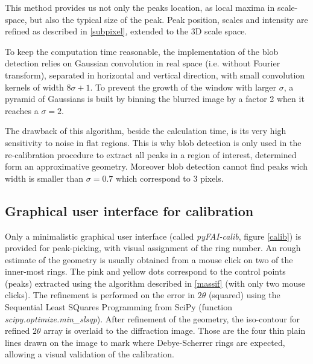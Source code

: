 \documentclass[preprint]{iucr}
\begin{document}
This method provides us not only the peaks location, as local maxima in
scale-space, but also the typical size of the peak.
Peak position, scales and intensity are refined as described in
\ref{subpixel}, extended to the 3D scale space.

To keep the computation time reasonable, the implementation of the blob
detection relies on Gaussian convolution in real space (i.e. without Fourier
transform), separated in horizontal and vertical direction, with small
convolution kernels of width $8 \sigma +1$.
To prevent the growth of the window with larger $\sigma$, a pyramid of Gaussians
is built by binning the blurred image by a factor 2 when it reaches a
$\sigma=2$.

The drawback of this algorithm, beside the calculation time, is its very high
sensitivity to noise in flat regions.
This is why blob detection is only used in the re-calibration procedure to
extract all peaks in a region of interest, determined form an
approximative geometry.
Moreover blob detection cannot find peaks wich width is smaller than
$\sigma=0.7$ which correspond to 3 pixels.


\subsection{Graphical user interface for calibration}
Only a minimalistic graphical user interface (called
\textit{pyFAI-calib}, figure \ref{calib}) is provided
for peak-picking, with visual assignment of the ring number.
An rough estimate of the geometry is usually obtained from a mouse click on
two of the inner-most rings.
The pink and yellow dots correspond to the control points (peaks) extracted
using the algorithm described in \ref{massif} (with only two mouse clicks).
The refinement is performed on the error in $2\theta$ (squared) using the
Sequential Least SQuares Programming  from
SciPy (function \textit{scipy.optimize.min\_slsqp}).
After refinement of the geometry, the iso-contour for refined $2\theta$ array is
overlaid to the diffraction image. Those are the four thin plain lines drawn on
the image to mark where Debye-Scherrer rings are expected, allowing a visual
validation of the calibration.
\end{document}
